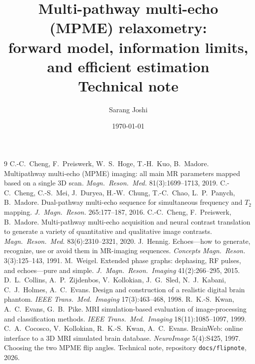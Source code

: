 \documentclass[11pt]{article}
\title{Multi-pathway multi-echo (MPME) relaxometry:\\
forward model, information limits, and efficient estimation\\[4pt]
\large Technical note}
\author{Sarang Joshi}
\date{\today}
\theoremstyle{definition}
\theoremstyle{remark}
\begin{document}
\maketitle


\tableofcontents
\clearpage













\appendix




\begin{thebibliography}{9}
 C.-C.~Cheng, F.~Preiswerk, W.~S.~Hoge, T.-H.~Kuo, B.~Madore.
  Multipathway multi-echo (MPME) imaging: all main MR parameters mapped based on a single
  3D scan. \emph{Magn.\ Reson.\ Med.} 81(3):1699--1713, 2019.
 C.-C.~Cheng, C.-S.~Mei, J.~Duryea, H.-W.~Chung, T.-C.~Chao,
  L.~P.~Panych, B.~Madore. Dual-pathway multi-echo sequence for simultaneous frequency and
  $T_2$ mapping. \emph{J.\ Magn.\ Reson.} 265:177--187, 2016.
 C.-C.~Cheng, F.~Preiswerk, B.~Madore. Multi-pathway multi-echo acquisition
  and neural contrast translation to generate a variety of quantitative and qualitative image
  contrasts. \emph{Magn.\ Reson.\ Med.} 83(6):2310--2321, 2020.
 J.~Hennig. Echoes---how to generate, recognize, use or avoid them in
  MR-imaging sequences. \emph{Concepts Magn.\ Reson.} 3(3):125--143, 1991.
 M.~Weigel. Extended phase graphs: dephasing, RF pulses, and
  echoes---pure and simple. \emph{J.\ Magn.\ Reson.\ Imaging} 41(2):266--295, 2015.
 D.~L.~Collins, A.~P.~Zijdenbos, V.~Kollokian, J.~G.~Sled, N.~J.~Kabani,
  C.~J.~Holmes, A.~C.~Evans. Design and construction of a realistic digital brain phantom.
  \emph{IEEE Trans.\ Med.\ Imaging} 17(3):463--468, 1998.
 R.~K.-S.~Kwan, A.~C.~Evans, G.~B.~Pike. MRI simulation-based evaluation of
  image-processing and classification methods. \emph{IEEE Trans.\ Med.\ Imaging}
  18(11):1085--1097, 1999.
 C.~A.~Cocosco, V.~Kollokian, R.~K.-S.~Kwan, A.~C.~Evans. BrainWeb: online
  interface to a 3D MRI simulated brain database. \emph{NeuroImage} 5(4):S425, 1997.
 Choosing the two MPME flip angles. Technical note, repository \texttt{docs/flipnote}, 2026.
\end{thebibliography}
\end{document}
